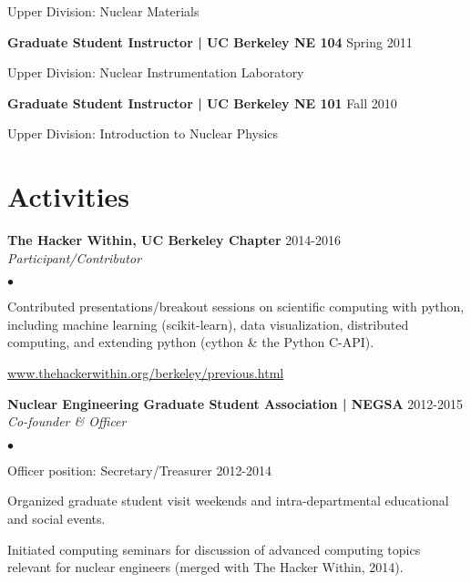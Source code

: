 \documentclass[margin,line]{res}
\newenvironment{list1}{
  \begin{list}{\ding{113}}{%
      \setlength{\itemsep}{0in}
      \setlength{\parsep}{0in} \setlength{\parskip}{0in}
      \setlength{\topsep}{0in} \setlength{\partopsep}{0in} 
      \setlength{\leftmargin}{0.17in}}}{\end{list}}
\newenvironment{list2}{
  \begin{list}{$\bullet$}{%
      \setlength{\itemsep}{0in}
      \setlength{\parsep}{0in} \setlength{\parskip}{0in}
      \setlength{\topsep}{0in} \setlength{\partopsep}{0in} 
      \setlength{\leftmargin}{0.2in}}}{\end{list}}
\begin{document}
\begin{resume}
\begin{list1}
  \item[] Upper Division: Nuclear Materials
\end{list1}
{\bf Graduate Student Instructor | UC Berkeley NE 104} \hfill Spring 2011

\begin{list1}
  \item[] Upper Division: Nuclear Instrumentation Laboratory
\end{list1}
{\bf Graduate Student Instructor | UC Berkeley NE 101} \hfill Fall 2010

\begin{list1}
  \item[] Upper Division: Introduction to Nuclear Physics
\end{list1}

\section{\sc Activities}

{\bf The Hacker Within, UC Berkeley Chapter} \hfill 2014-2016 \\ 
{\em Participant/Contributor} 

\begin{list2}
  \item Contributed presentations/breakout sessions on scientific computing
        with python, including machine learning (scikit-learn), data
        visualization, distributed computing, and extending python 
        (cython \& the Python C-API).
  \item \url{www.thehackerwithin.org/berkeley/previous.html}
\end{list2}

{\bf Nuclear Engineering Graduate Student Association | NEGSA} \hfill 2012-2015\\
{\em Co-founder \& Officer} 

\begin{list2}
  \item Officer position: Secretary/Treasurer \hfill 2012-2014
  \item Organized graduate student visit weekends and intra-departmental 
        educational and social events.
  \item Initiated computing seminars for discussion of advanced computing 
        topics relevant for nuclear engineers (merged with The Hacker Within,
        2014).
\end{list2}


\end{resume}
\end{document}
